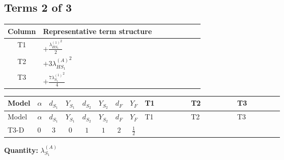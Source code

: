 \documentclass[8pt]{article}
\begin{document}
\begin{landscape}
\subsection*{Terms 2 of 3}
\begin{center}
\begin{tabular}{@{}c >{\raggedright\arraybackslash}p{0.82\linewidth}@{}}
\toprule
Column & Representative term structure \\
\midrule
T1 & \(\displaystyle +\frac{{\lambda_{HS_1}^{(1)}}^2}{2}\) \\
\midrule
T2 & \(\displaystyle +3 {\lambda_{HS_1}^{(A)}}^2\) \\
\midrule
T3 & \(\displaystyle +\frac{7 {\lambda_{S_1}^{(1)}}^2}{4}\) \\
\midrule
\bottomrule
\end{tabular}
\end{center}
\smallskip
\tiny
\begin{longtable}{@{}llcccccc >{\raggedright\arraybackslash}p{0.21\linewidth} >{\raggedright\arraybackslash}p{0.21\linewidth} >{\raggedright\arraybackslash}p{0.21\linewidth}@{}}
\toprule
Model & $\alpha$ & $d_{S_1}$ & $Y_{S_1}$ & $d_{S_2}$ & $Y_{S_2}$ & $d_F$ & $Y_F$ & T1 & T2 & T3 \\
\midrule
\endfirsthead
\toprule
Model & $\alpha$ & $d_{S_1}$ & $Y_{S_1}$ & $d_{S_2}$ & $Y_{S_2}$ & $d_F$ & $Y_F$ & T1 & T2 & T3 \\
\midrule
\endhead
T3-D & $0$ & $3$ & $0$ & $1$ & $1$ & $2$ & $\frac{1}{2}$ & \scriptsize\adjustbox{max width=\linewidth}{$\begin{gathered} +\frac{{\lambda_{HS_1}^{(1)}}^2}{2}\end{gathered}$} & \scriptsize\adjustbox{max width=\linewidth}{$\begin{gathered} +3 {\lambda_{HS_1}^{(A)}}^2\end{gathered}$} & \scriptsize\adjustbox{max width=\linewidth}{$\begin{gathered} +\frac{7 {\lambda_{S_1}^{(1)}}^2}{4}\end{gathered}$} \\
\midrule
\bottomrule
\end{longtable}
\clearpage
\noindent\textbf{Quantity: }$\lambda_{S_1}^{(A)}$\par\smallskip

\end{landscape}
\end{document}
